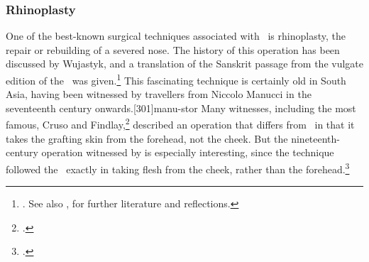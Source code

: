 

\subsubsection{Rhinoplasty}
\label{sec:rhinoplasty}

One of the best-known surgical techniques associated with \SS\ is rhinoplasty, the
repair or rebuilding of a severed nose. The history of this operation has been
discussed by Wujastyk, and a translation of the Sanskrit passage from the vulgate
edition of the \SS\ was given.\footnote{\cite[67--70, 99--100]{wuja-2003}. See
    also \cite[IB, 327--328, note 186]{meul-hist}, for further literature and
    reflections.} This fascinating technique is certainly old in South Asia, having
    been witnessed by travellers from Niccolo Manucci in the seventeenth century
    onwards.[301]{manu-stor} Many witnesses, including the most famous,
    Cruso and Findlay,\footcite[883, 891\,f.]{cowasjee} described an operation that
    differs from \SS\ in that it takes the grafting skin from the forehead, not the
    cheek.  But the nineteenth-century operation witnessed by \citeauthor{thor-bann}
    is especially interesting, since the technique followed  the \SS\ exactly in
    taking flesh from the cheek, rather than the
    forehead.\footcite[352--353]{thor-bann}

